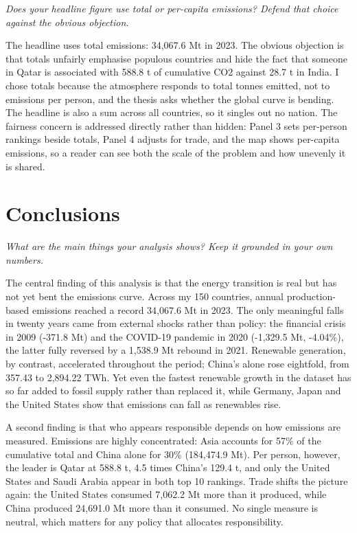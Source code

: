 \documentclass[
]{article}
\begin{document}
\emph{Does your headline figure use total or per-capita emissions?
Defend that choice against the obvious objection.}

The headline uses total emissions: 34,067.6 Mt in 2023. The obvious
objection is that totals unfairly emphasise populous countries and hide
the fact that someone in Qatar is associated with 588.8 t of cumulative
CO2 against 28.7 t in India. I chose totals because the atmosphere
responds to total tonnes emitted, not to emissions per person, and the
thesis asks whether the global curve is bending. The headline is also a
sum across all countries, so it singles out no nation. The fairness
concern is addressed directly rather than hidden: Panel 3 sets
per-person rankings beside totals, Panel 4 adjusts for trade, and the
map shows per-capita emissions, so a reader can see both the scale of
the problem and how unevenly it is shared.

\newpage

\section{Conclusions}\label{conclusions}

\emph{What are the main things your analysis shows? Keep it grounded in
your own numbers.}

The central finding of this analysis is that the energy transition is
real but has not yet bent the emissions curve. Across my 150 countries,
annual production-based emissions reached a record 34,067.6 Mt in 2023.
The only meaningful falls in twenty years came from external shocks
rather than policy: the financial crisis in 2009 (-371.8 Mt) and the
COVID-19 pandemic in 2020 (-1,329.5 Mt, -4.04\%), the latter fully
reversed by a 1,538.9 Mt rebound in 2021. Renewable generation, by
contrast, accelerated throughout the period; China's alone rose
eightfold, from 357.43 to 2,894.22 TWh. Yet even the fastest renewable
growth in the dataset has so far added to fossil supply rather than
replaced it, while Germany, Japan and the United States show that
emissions can fall as renewables rise.

A second finding is that who appears responsible depends on how
emissions are measured. Emissions are highly concentrated: Asia accounts
for 57\% of the cumulative total and China alone for 30\% (184,474.9
Mt). Per person, however, the leader is Qatar at 588.8 t, 4.5 times
China's 129.4 t, and only the United States and Saudi Arabia appear in
both top 10 rankings. Trade shifts the picture again: the United States
consumed 7,062.2 Mt more than it produced, while China produced 24,691.0
Mt more than it consumed. No single measure is neutral, which matters
for any policy that allocates responsibility.
\end{document}
